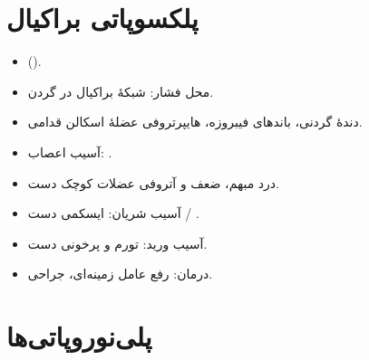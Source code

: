 \documentclass[a4paper,12pt]{extbook}
\begin{document}
\section*{پلکسوپاتی براکیال}
\begin{itemize}
\item {} ().
\item محل فشار: شبکهٔ براکیال در گردن.
\item دندهٔ گردنی، باندهای فیبروزه، هایپرتروفی عضلهٔ اسکالن قدامی.
\item آسیب اعصاب: .
\item درد مبهم، ضعف و آتروفی عضلات کوچک دست.
\item آسیب شریان: ایسکمی دست / .
\item آسیب ورید: تورم و پرخونی دست.
\item درمان: رفع عامل زمینه‌ای، جراحی.
\end{itemize}
\section*{پلی‌نوروپاتی‌ها}

\end{document}

